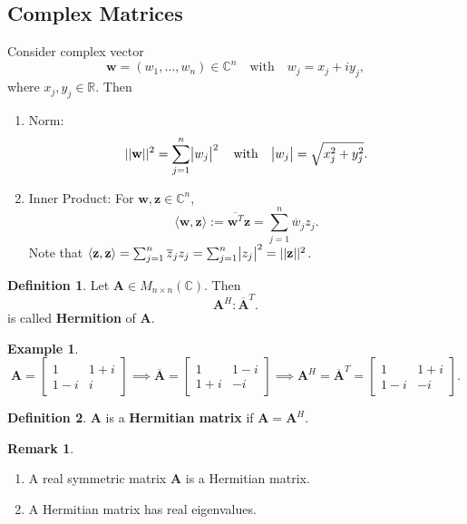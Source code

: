 \documentclass[12pt,openany]{book}
\theoremstyle{definition}
\newtheorem{definition}{Definition}[chapter]
\newtheorem{remark}{Remark}[chapter]
\newtheorem{example}{Example}[chapter]
\newcommand{\R}{\mathbb{R}}
\newcommand{\C}{\mathbb{C}}
\newcommand{\by}{\times}
\newcommand{\inner}[1]{\langle #1\rangle}
\newcommand{\norms}[1]{|| #1||}
\newcommand{\conjugate}[1]{\overline{#1}}
\renewcommand{\vec}[1]{\textbf{#1}}
\begin{document}
	\subsection{Complex Matrices}
	Consider complex vector \[
	\vec{w}=(w_1,\dots,w_n)\in\C^n\quad\text{with}\quad w_j=x_j+iy_j,
	\] where \(x_j,y_j\in\R\). Then \begin{enumerate}[(1)]
		\item Norm: \[
		\norms{\vec{w}}^2=\sum_{j=1}^n\abs{w_j}^2\quad\text{with}\quad \abs{w_j}=\sqrt{x_j^2+y_j^2}.
		\]
		\item Inner Product: For \(\vec{w},\vec{z}\in\C^n\), \[		
		\inner{\vec{w},\vec{z}}:=\conjugate{\vec{w}^T}\vec{z}=\sum_{j=1}^n\conjugate{w}_jz_j.
		\] Note that \(\inner{\vec{z},\vec{z}}=\sum_{j=1}^n\conjugate{z}_jz_j=\sum_{j=1}^n\abs{z_j}^2=\norms{\vec{z}}^2\).
	\end{enumerate} 
	\vspace{8pt}
	\begin{tcolorbox}[colframe=defcolor,title={\color{white}\bf Hermition}]
		\begin{definition}
			Let \(\textbf{A}\in M_{n\by n}(\C)\). Then \[
			\textbf{A}^H:\conjugate{\textbf{A}}^T.
			\] is called \textbf{Hermition} of \(\textbf{A}\).
		\end{definition}
	\end{tcolorbox}
	\begin{example}
		\[
		\textbf{A}=\begin{bmatrix}
			1&1+i\\1-i&i
		\end{bmatrix}\implies\conjugate{\textbf{A}}=\begin{bmatrix}
		1&1-i\\1+i&-i
	\end{bmatrix}\implies\textbf{A}^H=\conjugate{\textbf{A}}^T=\begin{bmatrix}
	1&1+i\\1-i&-i
\end{bmatrix}.
		\]
	\end{example}
	\vspace{4pt}
	\begin{tcolorbox}[colframe=defcolor,title={\color{white}\bf Hermitian Matrix}]
		\begin{definition}
			\(\textbf{A}\) is a \textbf{Hermitian matrix} if \(\textbf{A}=\textbf{A}^H\).
		\end{definition}
	\end{tcolorbox}
	\begin{remark}
		\ \begin{enumerate}[(1)]
			\item A real symmetric matrix \(\textbf{A}\) is a Hermitian matrix.
			\item A Hermitian matrix has real eigenvalues.
		\end{enumerate}
	\end{remark}
\end{document}
